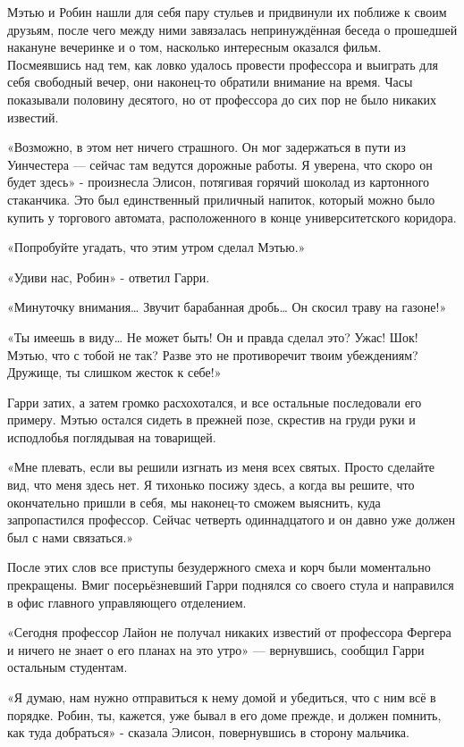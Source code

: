 \documentclass[a4paper,12pt]{book}
\begin{document}
\par
Мэтью и Робин нашли для себя пару стульев и придвинули их поближе к своим друзьям, после чего между ними завязалась непринуждённая беседа о прошедшей накануне вечеринке и о том, насколько интересным оказался фильм. Посмеявшись над тем, как ловко удалось провести профессора и выиграть для себя свободный вечер, они наконец-то обратили внимание на время. Часы показывали половину десятого, но от профессора до сих пор не было никаких известий.
\par
«Возможно, в этом нет ничего страшного. Он мог задержаться в пути из Уинчестера — сейчас там ведутся дорожные работы. Я уверена, что скоро он будет здесь» - произнесла Элисон, потягивая горячий шоколад из картонного стаканчика. Это был единственный приличный напиток, который можно было купить у торгового автомата, расположенного в конце университетского коридора.
\par
«Попробуйте угадать, что этим утром сделал Мэтью.»
\par
«Удиви нас, Робин» - ответил Гарри.
\par
«Минуточку внимания…  Звучит барабанная дробь… Он скосил траву на газоне!»
\par
«Ты имеешь в виду… Не может быть! Он и правда сделал это? Ужас! Шок! Мэтью, что с тобой не так? Разве это не противоречит твоим убеждениям? Дружище, ты слишком жесток к себе!»
\par
Гарри затих, а затем громко расхохотался, и все остальные последовали его примеру. Мэтью остался сидеть в прежней позе, скрестив на груди руки и исподлобья поглядывая на товарищей.
\par
«Мне плевать, если вы решили изгнать из меня всех святых. Просто сделайте вид, что меня здесь нет. Я тихонько посижу здесь, а когда вы решите, что окончательно пришли в себя, мы наконец-то сможем выяснить, куда запропастился профессор. Сейчас четверть одиннадцатого и он давно уже должен был с нами связаться.»
\par
После этих слов все приступы безудержного смеха и корч были моментально прекращены. Вмиг посерьёзневший Гарри поднялся со своего стула и направился в офис главного управляющего отделением.\\
\par
«Сегодня профессор Лайон не получал никаких известий от профессора Фергера и ничего не знает о его планах на это утро» — вернувшись, сообщил Гарри остальным студентам.
\par
«Я думаю, нам нужно отправиться к нему домой и убедиться, что с ним всё в порядке. Робин, ты, кажется, уже бывал в его доме прежде, и должен помнить, как туда добраться» - сказала Элисон, повернувшись в сторону мальчика.
\end{document}
